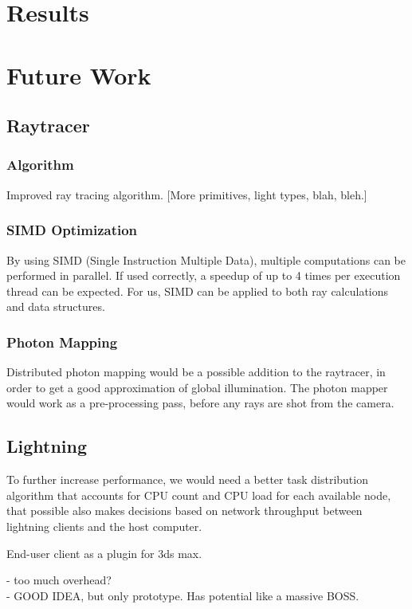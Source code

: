 \chapter{Results}

\chapter{Future Work}
\section{Raytracer}
\subsection{Algorithm}
Improved ray tracing algorithm. [More primitives, light types, blah, bleh.]

\subsection{SIMD Optimization}
By using SIMD (Single Instruction Multiple Data), multiple computations can be performed in parallel. If used correctly, a speedup of up to 4 times per execution thread can be expected. For us, SIMD can be applied to both ray calculations and data structures.

\subsection{Photon Mapping}
Distributed photon mapping would be a possible addition to the raytracer, in order to get a good approximation of global illumination. The photon mapper would work as a pre-processing pass, before any rays are shot from the camera.

\section{Lightning}
To further increase performance, we would need a better task distribution algorithm that accounts for CPU count and CPU load for each available node, that possible also makes decisions based on network throughput between lightning clients and the host computer.

End-user client as a plugin for 3ds max.

- too much overhead?\\
- GOOD IDEA, but only prototype. Has potential like a massive BOSS.
